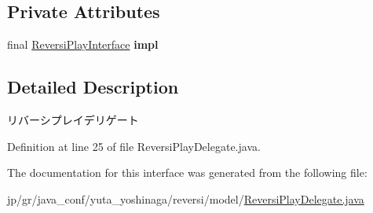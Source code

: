 \subsection*{Private Attributes}
\begin{DoxyCompactItemize}
\item 
\mbox{\label{classjp_1_1gr_1_1java__conf_1_1yuta__yoshinaga_1_1reversi_1_1model_1_1_reversi_play_delegate_a71b45ac9f49c47508ffef48c9e212d16}} 
final \hyperlink{interfacejp_1_1gr_1_1java__conf_1_1yuta__yoshinaga_1_1reversi_1_1model_1_1_reversi_play_interface}{Reversi\+Play\+Interface} {\bfseries impl}
\end{DoxyCompactItemize}


\subsection{Detailed Description}
リバーシプレイデリゲート 

Definition at line 25 of file Reversi\+Play\+Delegate.\+java.



The documentation for this interface was generated from the following file\+:\begin{DoxyCompactItemize}
\item 
jp/gr/java\+\_\+conf/yuta\+\_\+yoshinaga/reversi/model/\hyperlink{_reversi_play_delegate_8java}{Reversi\+Play\+Delegate.\+java}\end{DoxyCompactItemize}
